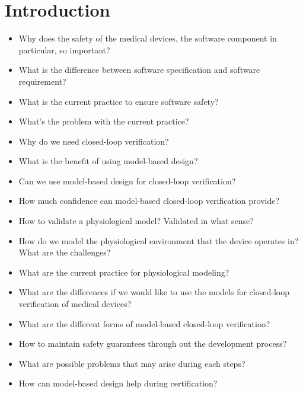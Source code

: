 \documentclass[openany]{now} %
\begin{document}
\chapter{Introduction}
\begin{itemize}
  \item Why does the safety of the medical devices, the software component in particular, so important?
  \item What is the difference between software specification and software requirement?
  \item What is the current practice to ensure software safety? 
  
  \item What's the problem with the current practice?
  \item Why do we need closed-loop verification?
  
  \item What is the benefit of using model-based design?
  \item Can we use model-based design for closed-loop verification?
  \item How much confidence can model-based closed-loop verification provide?
  \item How to validate a physiological model? Validated in what sense?
  \item How do we model the physiological environment that the device operates in? What are the challenges?
  \item What are the current practice for physiological modeling?
  \item What are the differences if we would like to use the models for closed-loop verification of medical devices?
	\item What are the different forms of model-based closed-loop verification?

    \item How to maintain safety guarantees through out the development process?
    \item What are possible problems that may arise during each steps?
    \item How can model-based design help during certification?



\end{itemize}
\end{document}
